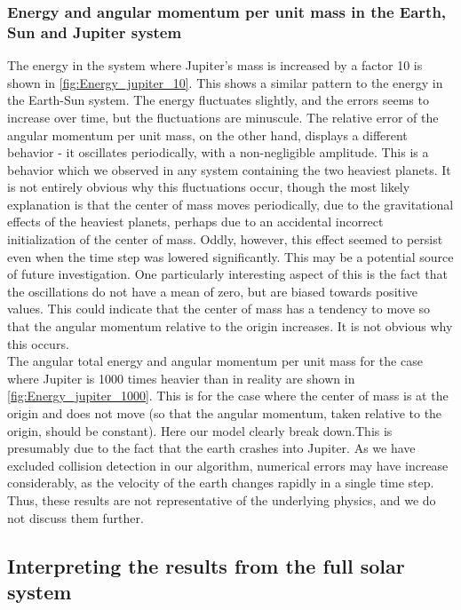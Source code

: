 \documentclass[a4paper, 10pt]{article}
\begin{document}
\subsubsection{Energy and angular momentum per unit mass in the Earth, Sun and Jupiter system}
The energy in the system where Jupiter's mass is increased by a factor 10 is shown in \cref{fig:Energy_jupiter_10}. This shows a similar pattern to the energy in the Earth-Sun system. The energy fluctuates slightly, and the errors seems to increase over time, but the fluctuations are minuscule. The relative error of the angular momentum per unit mass, on the other hand, displays a different behavior - it oscillates periodically, with a non-negligible amplitude. This is a behavior which we observed in any system containing the two heaviest planets. It is not entirely obvious why this fluctuations occur, though the most likely explanation is that the center of mass moves periodically, due to the gravitational effects of the heaviest planets, perhaps due to an accidental incorrect initialization of the center of mass. Oddly, however, this effect seemed to persist even when the time step was lowered significantly. This may be a potential source of future investigation. One particularly interesting aspect of this is the fact that the oscillations do not have a mean of zero, but are biased towards positive values. This could indicate that the center of mass has a tendency to move so that the angular momentum relative to the origin increases. It is not obvious why this occurs.\\
\linebreak
The angular total energy and angular momentum per unit mass for the case where Jupiter is 1000 times heavier than in reality are shown in \cref{fig:Energy_jupiter_1000}. This is for the case where the center of mass is at the origin and does not move (so that the angular momentum, taken relative to the origin, should be constant). Here our model clearly break down.This is presumably due to the fact that the earth crashes into Jupiter. As we have excluded collision detection in our algorithm, numerical errors may have increase considerably, as the velocity of the earth changes rapidly in a single time step. Thus, these results are not representative of the underlying physics, and we do not discuss them further.
\subsection{Interpreting the results from the full solar system}
\end{document}
